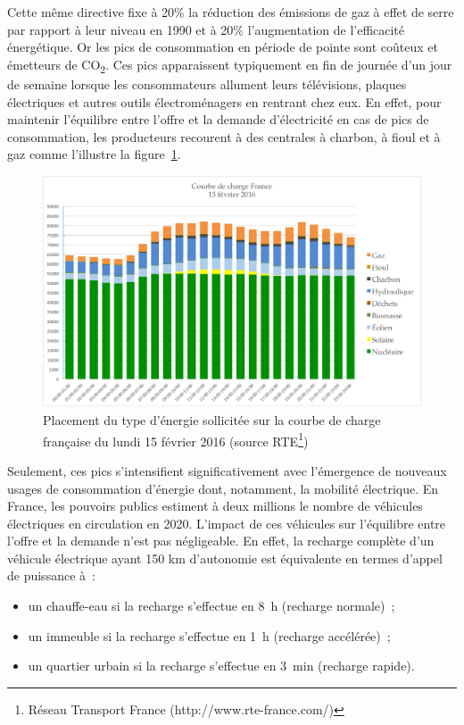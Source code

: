Cette même directive fixe à 20\% la réduction des émissions de gaz à effet de 
serre par rapport à leur niveau en 1990 et à 20\% l'augmentation de l'efficacité 
énergétique. Or les pics de consommation en période de pointe sont coûteux et 
émetteurs de CO\textsubscript{2}. Ces pics apparaissent typiquement en fin de journée d'un 
jour de semaine lorsque les consommateurs allument leurs télévisions, plaques électriques 
et autres outils électroménagers en rentrant chez eux.  En effet, pour maintenir 
l'équilibre entre l'offre et la demande d'électricité en cas de pics de 
consommation, les producteurs recourent à des centrales à charbon, à fioul et à 
gaz comme l'illustre la figure~\ref{fig:courbeCharge}. 


\begin{figure}[!ht]
 \begin{center}
\includegraphics[width=1\textwidth]{figures/1_problematique/courbe_charge.pdf}
 \end{center}
 \caption{Placement du type d'énergie sollicitée sur la courbe de charge 
française du lundi 15 février 2016 (source RTE\protect\footnote{ Réseau Transport France (http://www.rte-france.com/)})}
 \label{fig:courbeCharge}
\end{figure}

Seulement, ces pics s'intensifient significativement avec l'émergence de nouveaux usages de 
consommation d'énergie dont, notamment, la mobilité électrique. En France, les 
pouvoirs publics estiment à deux millions le nombre de véhicules électriques en 
circulation en 2020. L'impact de ces véhicules sur l'équilibre entre l'offre et 
la demande n'est pas négligeable. En effet, la recharge complète d'un véhicule 
électrique ayant 150 km d'autonomie est équivalente en termes d'appel de 
puissance à~:
\begin{itemize}[noitemsep]
    \item un chauffe-eau si la recharge s'effectue en 8~h (recharge normale)~;
    \item un immeuble si la recharge s'effectue en 1~h (recharge accélérée)~;
    \item un quartier urbain si la recharge s'effectue en 3~min (recharge rapide).
\end{itemize}

